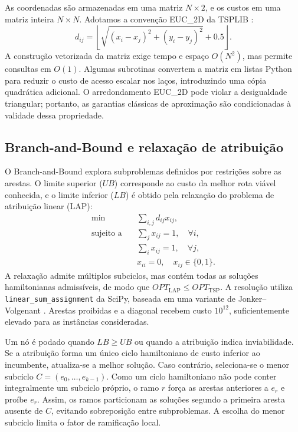 As coordenadas são armazenadas em uma matriz $N\times2$, e os custos em uma matriz inteira $N\times N$. Adotamos a convenção EUC\_2D da TSPLIB \cite{reinelt1991}:
\begin{equation}
d_{ij}=\left\lfloor\sqrt{(x_i-x_j)^2+(y_i-y_j)^2}+0.5\right\rfloor.
\end{equation}
A construção vetorizada da matriz exige tempo e espaço $O(N^2)$, mas permite consultas em $O(1)$. Algumas subrotinas convertem a matriz em listas Python para reduzir o custo de acesso escalar nos laços, introduzindo uma cópia quadrática adicional. O arredondamento EUC\_2D pode violar a desigualdade triangular; portanto, as garantias clássicas de aproximação são condicionadas à validade dessa propriedade.

\subsection{Branch-and-Bound e relaxação de atribuição}

O Branch-and-Bound explora subproblemas definidos por restrições sobre as arestas. O limite superior ($UB$) corresponde ao custo da melhor rota viável conhecida, e o limite inferior ($LB$) é obtido pela relaxação do problema de atribuição linear (LAP):
\begin{align}
\min\quad &\sum_{i,j}d_{ij}x_{ij},\\
\text{sujeito a}\quad &\sum_j x_{ij}=1,\quad \forall i,\\
&\sum_i x_{ij}=1,\quad \forall j,\\
&x_{ii}=0,\quad x_{ij}\in\{0,1\}.
\end{align}
A relaxação admite múltiplos subciclos, mas contém todas as soluções hamiltonianas admissíveis, de modo que $OPT_{\mathrm{LAP}}\leq OPT_{\mathrm{TSP}}$. A resolução utiliza \texttt{linear\_sum\_assignment} da SciPy, baseada em uma variante de Jonker--Volgenant \cite{jonker1987,scipy2020}. Arestas proibidas e a diagonal recebem custo $10^{12}$, suficientemente elevado para as instâncias consideradas.

Um nó é podado quando $LB\geq UB$ ou quando a atribuição indica inviabilidade. Se a atribuição forma um único ciclo hamiltoniano de custo inferior ao incumbente, atualiza-se a melhor solução. Caso contrário, seleciona-se o menor subciclo $C=(e_0,\ldots,e_{k-1})$. Como um ciclo hamiltoniano não pode conter integralmente um subciclo próprio, o ramo $r$ força as arestas anteriores a $e_r$ e proíbe $e_r$. Assim, os ramos particionam as soluções segundo a primeira aresta ausente de $C$, evitando sobreposição entre subproblemas. A escolha do menor subciclo limita o fator de ramificação local.

